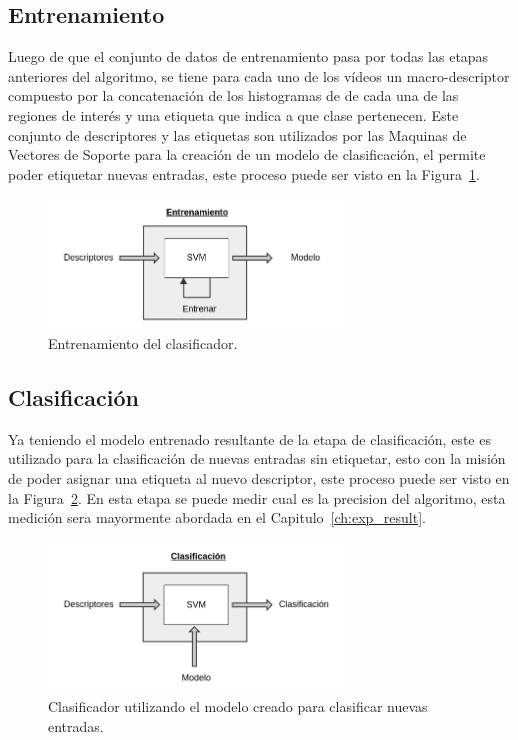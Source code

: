 	\subsection{Entrenamiento}
	\label{algoritmo:entrenamiento}
		Luego de que el conjunto de datos de entrenamiento pasa por todas las etapas anteriores del algoritmo, se tiene para cada uno de los vídeos un macro-descriptor compuesto por la concatenación de los histogramas de de cada una de las regiones de interés y una etiqueta que indica a que clase pertenecen. Este conjunto de descriptores y las etiquetas son utilizados por las Maquinas de Vectores de Soporte para la creación de un modelo de clasificación, el permite poder etiquetar nuevas entradas, este proceso puede ser visto en la Figura~\ref{algoritmo:fig:entrenamiento}.
		
	\begin{figure}[bt]
		\centering
  		\label{algoritmo:fig:entrenamiento}
    		\includegraphics[width=0.7\textwidth]{Figuras/Diagramas/Entrenamiento.png}
  		\caption{Entrenamiento del clasificador.}
	\end{figure}	
		
		
	\subsection{Clasificación}
	\label{algoritmo:clasificacion}
		Ya teniendo el modelo entrenado resultante de la etapa de clasificación, este es utilizado para la clasificación de nuevas entradas sin etiquetar, esto con la misión de poder asignar una etiqueta al nuevo descriptor, este proceso puede ser visto en la Figura~\ref{algoritmo:fig:clasificacion}. En esta etapa se puede medir cual es la precision del algoritmo, esta medición sera mayormente abordada en el Capitulo~\ref{ch:exp_result}.
	
	\begin{figure}[bt]
		\centering
  		\label{algoritmo:fig:clasificacion}
    		\includegraphics[width=0.7\textwidth]{Figuras/Diagramas/Clasificacion.png}
  		\caption{Clasificador utilizando el modelo creado para clasificar nuevas entradas.}
	\end{figure}	
		
	
	
	
	
	